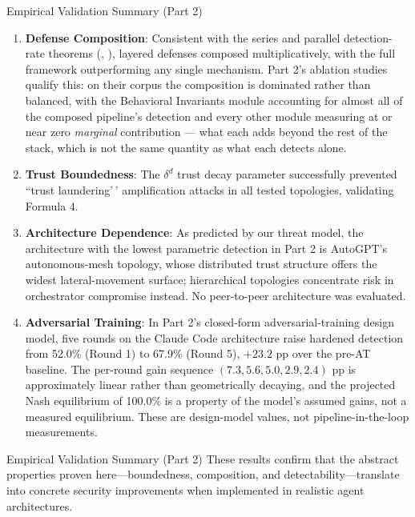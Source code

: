 \documentclass[
  ignorenonframetext,
]{beamer}
\providecommand{\tightlist}{%
  \setlength{\itemsep}{0pt}\setlength{\parskip}{0pt}}
\providecommand{\cref}[1]{\texttt{\detokenize{#1}}}
\begin{document}
\begin{frame}[allowframebreaks]{Empirical Validation Summary (Part 2)}
\begin{enumerate}
\tightlist
\item
  \textbf{Defense Composition}: Consistent with the series and parallel
  detection-rate theorems (\cref{thm:series-detection},
  \cref{thm:parallel-detection}), layered defenses composed
  multiplicatively, with the full framework outperforming any single
  mechanism. Part 2's ablation studies qualify this: on their corpus the
  composition is dominated rather than balanced, with the Behavioral
  Invariants module accounting for almost all of the composed pipeline's
  detection and every other module measuring at or near zero
  \emph{marginal} contribution --- what each adds beyond the rest of the
  stack, which is not the same quantity as what each detects alone.
\item
  \textbf{Trust Boundedness}: The \(\delta^d\) trust decay parameter
  successfully prevented ``trust laundering'\,' amplification attacks in
  all tested topologies, validating Formula 4.
\item
  \textbf{Architecture Dependence}: As predicted by our threat model,
  the architecture with the lowest parametric detection in Part 2 is
  AutoGPT's autonomous-mesh topology, whose distributed trust structure
  offers the widest lateral-movement surface; hierarchical topologies
  concentrate risk in orchestrator compromise instead. No peer-to-peer
  architecture was evaluated.
\item
  \textbf{Adversarial Training}: In Part 2's closed-form
  adversarial-training design model, five rounds on the Claude Code
  architecture raise hardened detection from 52.0\% (Round 1) to 67.9\%
  (Round 5), \(+23.2\) pp over the pre-AT baseline. The per-round gain
  sequence \((7.3, 5.6, 5.0, 2.9, 2.4)\) pp is approximately linear
  rather than geometrically decaying, and the projected Nash equilibrium
  of 100.0\% is a property of the model's assumed gains, not a measured
  equilibrium. These are design-model values, not pipeline-in-the-loop
  measurements.
\end{enumerate}

\end{frame}

\begin{frame}[allowframebreaks]{Empirical Validation Summary (Part 2)}
These results confirm that the abstract properties proven
here---boundedness, composition, and detectability---translate into
concrete security improvements when implemented in realistic agent
architectures.
\end{frame}
\end{document}
